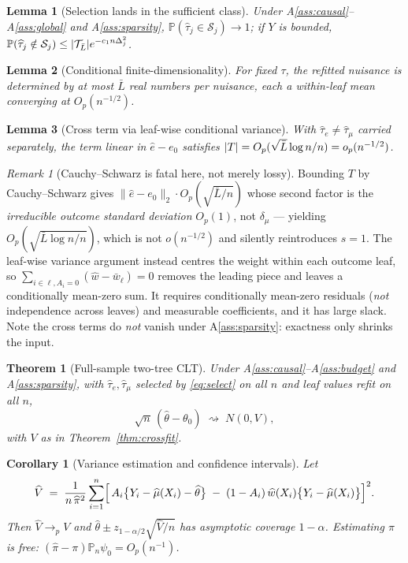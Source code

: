 \documentclass[11pt]{article}
\theoremstyle{plain}
\newtheorem{theorem}{Theorem}
\newtheorem{lemma}{Lemma}
\newtheorem{corollary}{Corollary}
\theoremstyle{definition}
\theoremstyle{remark}
\newtheorem{remark}{Remark}
\newcommand{\PP}{\mathbb{P}}
\newcommand{\Pn}{\mathbb{P}_n}
\newcommand{\cT}{\mathcal{T}}
\newcommand{\cS}{\mathcal{S}}
\newcommand{\ez}{e_0}
\newcommand{\ehat}{\widehat{e}}
\newcommand{\mhat}{\widehat{\mu}}
\newcommand{\what}{\widehat{w}}
\newcommand{\that}{\widehat{\tau}}
\newcommand{\thetahat}{\widehat{\theta}}
\newcommand{\pihat}{\widehat{\pi}}
\newcommand{\Vhat}{\widehat{V}}
\newcommand{\Ltwo}[1]{\lVert #1 \rVert_{2}}
\DeclarePairedDelimiter{\abs}{\lvert}{\rvert}
\DeclarePairedDelimiter{\card}{\lvert}{\rvert}
\begin{document}
\begin{lemma}[Selection lands in the sufficient class]\label{lem:selection}
Under A\ref{ass:causal}--A\ref{ass:global} and A\ref{ass:sparsity},
$\PP(\that_j\in\cS_j)\to1$; if $Y$ is bounded,
$\PP(\that_j\notin\cS_j)\le\card{\cT_{\bar L}}e^{-c_1n\Delta_j^2}$.
\end{lemma}

\begin{lemma}[Conditional finite-dimensionality]\label{lem:findim}
For fixed $\tau$, the refitted nuisance is determined by at most $\bar L$ real
numbers per nuisance, each a within-leaf mean converging at $O_p(n^{-1/2})$.
\end{lemma}

\begin{lemma}[Cross term via leaf-wise conditional variance]\label{lem:cross}
With $\that_e\ne\that_\mu$ carried separately, the term linear in
$\ehat-\ez$ satisfies $\abs{T}=O_p(\sqrt{\bar L}\log n/n)=o_p(n^{-1/2})$.
\end{lemma}

\begin{remark}[Cauchy--Schwarz is fatal here, not merely lossy]\label{rem:cs}
Bounding $T$ by Cauchy--Schwarz gives
$\Ltwo{\ehat-\ez}\cdot O_p(\sqrt{\bar L/n})$ whose second factor is the
\emph{irreducible outcome standard deviation} $O_p(1)$, not $\delta_\mu$ ---
yielding $O_p(\sqrt{\bar L\log n/n})$, which is not $o(n^{-1/2})$ and silently
reintroduces $s=1$. The leaf-wise variance argument instead centres the weight
within each outcome leaf, so
$\sum_{i\in\ell,A_i=0}(\what-\bar w_\ell)=0$ removes the leading piece and leaves
a conditionally mean-zero sum. It requires conditionally mean-zero residuals
(\emph{not} independence across leaves) and measurable coefficients, and it has
large slack. Note the cross terms do \emph{not} vanish under
A\ref{ass:sparsity}: exactness only shrinks the input.
\end{remark}

\begin{theorem}[Full-sample two-tree CLT]\label{thm:main}
Under A\ref{ass:causal}--A\ref{ass:budget} and A\ref{ass:sparsity}, with
$\that_e,\that_\mu$ selected by \eqref{eq:select} on all $n$ and leaf values
refit on all $n$,
\[
  \sqrt n\,(\thetahat-\theta_0)\;\rightsquigarrow\;N(0,V),
\]
with $V$ as in Theorem~\ref{thm:crossfit}.
\end{theorem}

\begin{corollary}[Variance estimation and confidence intervals]\label{cor:variance}
Let
\begin{equation}\label{eq:vhat}
  \Vhat \;=\; \frac{1}{n\,\pihat^{2}}\sum_{i=1}^n
  \Bigl[\,A_i\bigl\{Y_i-\mhat(X_i)-\thetahat\bigr\}
   \;-\;(1-A_i)\,\what(X_i)\bigl\{Y_i-\mhat(X_i)\bigr\}\Bigr]^2 .
\end{equation}
Then $\Vhat\to_p V$ and
$\thetahat\pm z_{1-\alpha/2}\sqrt{\Vhat/n}$ has asymptotic coverage $1-\alpha$.
Estimating $\pi$ is free: $(\pihat-\pi)\Pn\psi_0=O_p(n^{-1})$.
\end{corollary}
\end{document}
